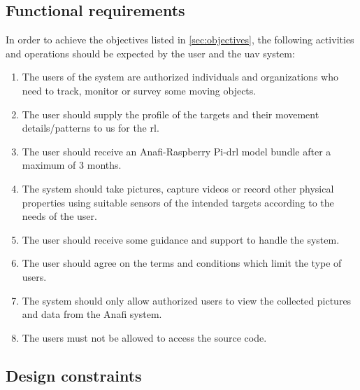 \documentclass[../main.tex]{subfiles}
\begin{document}
\subsection{Functional requirements}

In order to achieve the objectives listed
in \cref{sec:objectives}, the following activities 
and operations should be expected by the user 
and the \gls{uav} system:

\begin{enumerate}
    \item The users of the system are authorized
        individuals and organizations who
        need to track, monitor or survey
        some moving objects.
    \item The user should supply the 
        profile of the targets 
        and their movement details/patterns
        to us for the \gls{rl}.
    \item The user should receive 
        an Anafi-Raspberry Pi-\gls{drl} 
        model bundle after a maximum of 3 months.
    \item The system should take pictures, capture videos
        or record other physical properties using
        suitable sensors of the intended
        targets according to the needs
        of the user.
    \item The user should receive some 
        guidance and support 
        to handle the system.
    \item The user should agree on 
        the terms and conditions 
        which limit the type of users.
    \item The system should only allow 
        authorized users 
        to view the collected pictures and 
        data from the Anafi system.
    \item The users must not be allowed to access 
        the source code.
\end{enumerate}

\newpage
\subsection{Design constraints}
\end{document}
